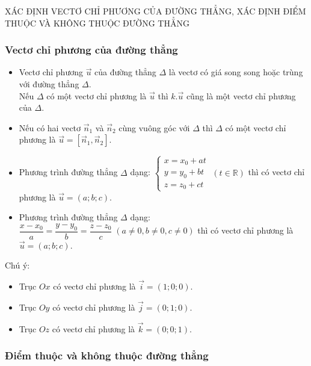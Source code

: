 \begin{dang}{XÁC ĐỊNH VECTƠ CHỈ PHƯƠNG CỦA ĐƯỜNG THẲNG, XÁC ĐỊNH ĐIỂM THUỘC VÀ KHÔNG THUỘC ĐƯỜNG THẲNG}
\end{dang}
 

 \subsubsection{Vectơ chỉ phương của đường thẳng}

\begin{itemize}
	\item  Vectơ chỉ phương $\overrightarrow{u}$ của đường thẳng $\Delta $ là vectơ có giá song song hoặc trùng với đường thẳng $\Delta $.\\
Nếu $\Delta $ có một vectơ chỉ phương là $\overrightarrow{u}$ thì $k.\overrightarrow{u}$ cũng là một vectơ chỉ phương của $\Delta $.
	\item    Nếu có hai vectơ $\overrightarrow{n}_{1} $ và $\overrightarrow{n}_{2} $ cùng vuông góc với $\Delta $ thì $\Delta $ có một vectơ chỉ phương là $\overrightarrow{u}=[\overrightarrow{n}_{1} ,\overrightarrow{n}_{2} ].$
   \item Phương trình đường thẳng \(\Delta\) dạng: \(\left\{\begin{array}{l} x = x_0 + at \\ y = y_0 + bt \\ z = z_0 + ct \end{array}\right. \; (t \in \mathbb{R})\) thì có vectơ chỉ phương là \(\overrightarrow{u} = (a; b; c)\).
    \item Phương trình đường thẳng \(\Delta\) dạng: \(\dfrac{x - x_0}{a} = \dfrac{y - y_0}{b} = \dfrac{z - z_0}{c} \; (a \neq 0, b \neq 0, c \neq 0)\) thì có vectơ chỉ phương là \(\overrightarrow{u} = (a; b; c)\).
\end{itemize}

\begin{note} Chú ý:
\begin{itemize}
	\item  Trục $Ox$ có vectơ chỉ phương là $\overrightarrow{i}=(1;0;0)$.
	\item  Trục $Oy$ có vectơ chỉ phương là $\overrightarrow{j}=(0;1;0)$.
	\item  Trục $Oz$ có vectơ chỉ phương là $\overrightarrow{k}=(0;0;1)$.
\end{itemize}
 \end{note}

\subsubsection{Điểm thuộc và không thuộc đường thẳng}

